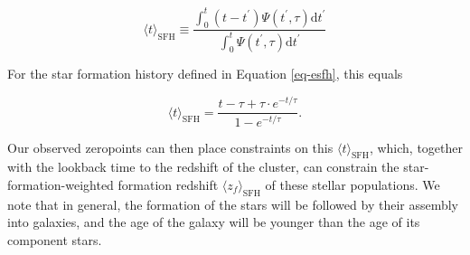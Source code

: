 \begin{equation}\label{eq-tsfh}
\langle t \rangle_\mathrm{SFH} \equiv \frac{\int_0^t(t-t^\prime)\Psi(t^\prime,\tau)\mathrm{d}t^\prime}
{\int_0^t\Psi(t^\prime,\tau)\mathrm{d}t^\prime}
\end{equation}

For the star formation history defined in Equation \ref{eq-esfh}, this equals

\begin{equation}\label{eq-etsfh}
\langle t \rangle_\mathrm{SFH} = \frac{t - \tau + \tau\cdot e^{-t/\tau}}{1-e^{-t/\tau}} .
\end{equation}

Our observed zeropoints can then place constraints on this $\langle t \rangle_\mathrm{SFH}$, which, together with the lookback time to the redshift of the cluster, can constrain the star-formation-weighted formation redshift $\langle z_f \rangle_\mathrm{SFH}$ of these stellar populations. We note that in general, the formation of the stars will be followed by their assembly into galaxies, and the age of the galaxy will be younger than the age of its component stars.
\clearpage

